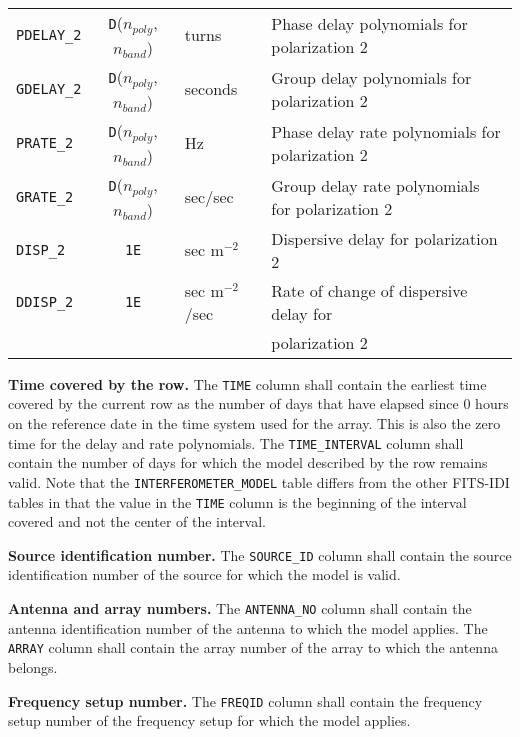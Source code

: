 \documentclass[twoside]{article}
\newcommand{\Hi}[1]{\textcolor{hicol}{#1}}
\newcommand{\Me}[1]{\textcolor{mecol}{#1}}
\newcommand{\nband}{$n_{band}$}
\newcommand{\npoly}{$n_{poly}$}
\begin{document}
\begin{center}
\begin{tabular}{lcll}
\hline
{\tt PDELAY\_2}   & \Hi{{\tt D}}(\npoly,\nband) & turns & Phase delay
                                       polynomials for polarization 2 \\
{\tt GDELAY\_2}   & \Hi{{\tt D}}(\npoly,\nband) & seconds & Group delay
                                       polynomials for polarization 2 \\
{\tt PRATE\_2}    & \Hi{{\tt D}}(\npoly,\nband) & Hz & Phase delay rate
                                       polynomials for polarization 2 \\
{\tt GRATE\_2}    & \Hi{{\tt D}}(\npoly,\nband) & sec/sec & Group delay rate
                                       polynomials for polarization 2 \\
{\tt DISP\_2}     & {\tt 1E} & sec \Me{m$^{-2}$} & Dispersive delay for
                                       polarization 2 \\
{\tt DDISP\_2}    & {\tt 1E} & sec \Me{m$^{-2}$}/sec & Rate of change of dispersive
                                       delay for \\
                  &          &         & \hspace{1em} polarization 2 \\
\end{tabular}
\end{center}

{\bf Time covered by the row.}  The {\tt TIME} column shall contain
the earliest time covered by the current row as the number of days
that have elapsed since 0 hours on the reference date in the time
system used for the array.  This is also the zero time for the delay
and rate polynomials.  The {\tt TIME\_INTERVAL} column shall contain
the number of days for which the model described by the row remains
valid.  Note that the {\tt INTERFEROMETER\_MODEL} table differs from
the other FITS-IDI tables in that the value in the {\tt TIME} column
is the beginning of the interval covered and not the center of the
interval.

{\bf Source identification number.}  The {\tt SOURCE\_ID} column shall
contain the source identification number of the source for which the
model is valid.

{\bf Antenna and array numbers.}  The {\tt ANTENNA\_NO} column shall
contain the antenna identification number of the antenna to which the
model applies.  The {\tt ARRAY} column shall contain the array number
of the array to which the antenna belongs.

{\bf Frequency setup number.}  The {\tt FREQID} column shall contain
the frequency setup number of the frequency setup for which the model
applies.
\end{document}
